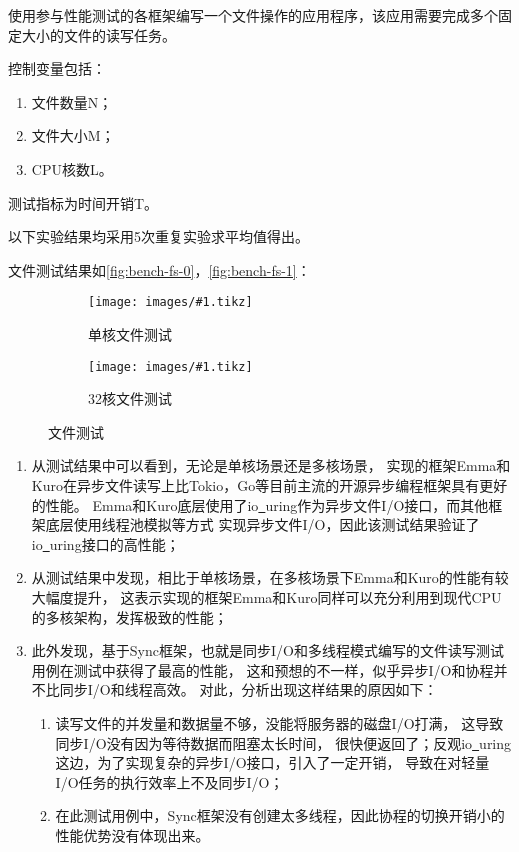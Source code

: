 \documentclass[supercite]{HustGraduPaper}
\newcommand{\cfig}[3]{
  \begin{figure}[htb]
    \centering
    \texttt{[image: images/\#1.tikz]}
    \caption{#3}
    \label{fig:#1}
  \end{figure}
}
\newcommand{\sfig}[3]{
  \begin{subfigure}[b]{#2\textwidth}
    \texttt{[image: images/\#1.tikz]}
    \caption{#3}
    \label{fig:#1}
  \end{subfigure}
}
\newcommand{\xfig}[3]{
  \begin{figure}[htb]
    \centering
    #3
    \caption{#2}
    \label{fig:#1}
  \end{figure}
}
\newcommand{\rfig}[1]{\autoref{fig:#1}}
\theoremstyle{definition}
\begin{document}

使用参与性能测试的各框架编写一个文件操作的应用程序，该应用需要完成多个固定大小的文件的读写任务。\par

控制变量包括：

\begin{enumerate}[label={(\arabic*)}]
  \item 文件数量N；
  \item 文件大小M；
  \item CPU核数L。
\end{enumerate}

测试指标为时间开销T。\par

以下实验结果均采用5次重复实验求平均值得出。\par

文件测试结果如\rfig{bench-fs-0}，\rfig{bench-fs-1}：

%

\xfig{bench-fs}{文件测试}{
  \sfig{bench-fs-0}{0.4}{单核文件测试}
  \sfig{bench-fs-1}{0.4}{32核文件测试}
}


\begin{enumerate}[label={(\arabic*)}]
  \item 从测试结果中可以看到，无论是单核场景还是多核场景，
    实现的框架Emma和Kuro在异步文件读写上比Tokio，Go等目前主流的开源异步编程框架具有更好的性能。
    Emma和Kuro底层使用了io\underline{~}uring作为异步文件I/O接口，而其他框架底层使用线程池模拟等方式
    实现异步文件I/O，因此该测试结果验证了io\underline{~}uring接口的高性能；
  \item 从测试结果中发现，相比于单核场景，在多核场景下Emma和Kuro的性能有较大幅度提升，
    这表示实现的框架Emma和Kuro同样可以充分利用到现代CPU的多核架构，发挥极致的性能；
  \item 此外发现，基于Sync框架，也就是同步I/O和多线程模式编写的文件读写测试用例在测试中获得了最高的性能，
    这和预想的不一样，似乎异步I/O和协程并不比同步I/O和线程高效。
    对此，分析出现这样结果的原因如下：
    \begin{enumerate}
      \item 读写文件的并发量和数据量不够，没能将服务器的磁盘I/O打满，
        这导致同步I/O没有因为等待数据而阻塞太长时间，
        很快便返回了；反观io\underline{~}uring这边，为了实现复杂的异步I/O接口，引入了一定开销，
        导致在对轻量I/O任务的执行效率上不及同步I/O；
      \item 在此测试用例中，Sync框架没有创建太多线程，因此协程的切换开销小的性能优势没有体现出来。
    \end{enumerate}
\end{enumerate}
\end{document}
